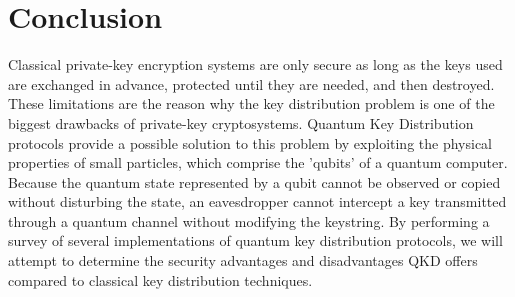 \documentclass[conference]{IEEEtran}
\begin{document}

\section{Conclusion}
Classical private-key encryption systems are only secure as long as the keys used are exchanged in advance, protected until they are needed, and then destroyed. These limitations are the reason why the key distribution problem is one of the biggest drawbacks of private-key cryptosystems. Quantum Key Distribution protocols provide a possible solution to this problem by exploiting the physical properties of small particles, which comprise the 'qubits' of a quantum computer.\\

Because the quantum state represented by a qubit cannot be observed or copied without disturbing the state, an eavesdropper cannot intercept a key transmitted through a quantum channel without modifying the keystring. By performing a survey of several implementations of quantum key distribution protocols, we will attempt to determine the security advantages and disadvantages QKD offers compared to classical key distribution techniques.\\



%
%
%
\end{document}
